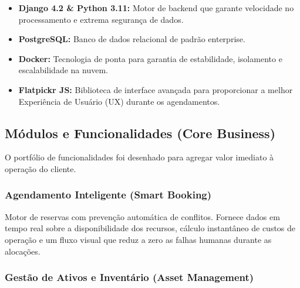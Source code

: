 \documentclass[12pt,a4paper]{article}
\begin{document}
	\begin{itemize}
		
		\item \textbf{Django 4.2 \& Python 3.11:} Motor de backend que garante velocidade no processamento e extrema segurança de dados.
		
		\item \textbf{PostgreSQL:} Banco de dados relacional de padrão enterprise.
		
		\item \textbf{Docker:} Tecnologia de ponta para garantia de estabilidade, isolamento e escalabilidade na nuvem.
		
		\item \textbf{Flatpickr JS:} Biblioteca de interface avançada para proporcionar a melhor Experiência de Usuário (UX) durante os agendamentos.
		
	\end{itemize}
	
	
	\subsection{Módulos e Funcionalidades (Core Business)}
	
	O portfólio de funcionalidades foi desenhado para agregar valor imediato à operação do cliente.
	
	
	\subsubsection{Agendamento Inteligente (Smart Booking)}
	
	Motor de reservas com prevenção automática de conflitos. Fornece dados em tempo real sobre a disponibilidade dos recursos, cálculo instantâneo de custos de operação e um fluxo visual que reduz a zero as falhas humanas durante as alocações.
	
	
	\subsubsection{Gestão de Ativos e Inventário (Asset Management)}
	
\end{document}
